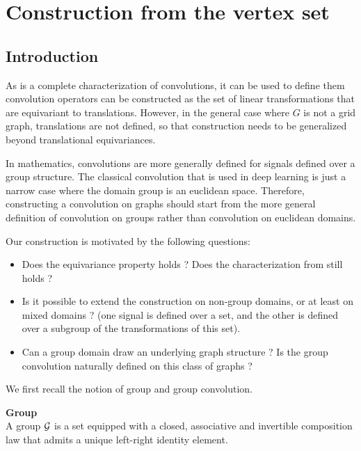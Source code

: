 \section{Construction from the vertex set}

\subsection{Introduction}

As  is a complete characterization of convolutions, it can be used to define them \ie convolution operators can be constructed as the set of linear transformations that are equivariant to translations. However, in the general case where $G$ is not a grid graph, translations are not defined, so that construction needs to be generalized beyond translational equivariances.

In mathematics, convolutions are more generally defined for signals defined over a group structure. The classical convolution that is used in deep learning is just a narrow case where the domain group is an euclidean space. Therefore, constructing a convolution on graphs should start from the more general definition of convolution on groups rather than convolution on euclidean domains.

Our construction is motivated by the following questions:
\begin{itemize}
\item Does the equivariance property holds ? Does the characterization from  still holds ?
\item Is it possible to extend the construction on non-group domains, or at least on mixed domains ? (\ie one signal is defined over a set, and the other is defined over a subgroup of the transformations of this set).
\item Can a group domain draw an underlying graph structure ? Is the group convolution naturally defined on this class of graphs ?
\end{itemize}


We first recall the notion of group and group convolution.

\begin{definition}\textbf{Group}\\
A group $\mathcal{G}$ is a set equipped with a closed, associative and invertible composition law that admits a unique left-right identity element.
\end{definition}


